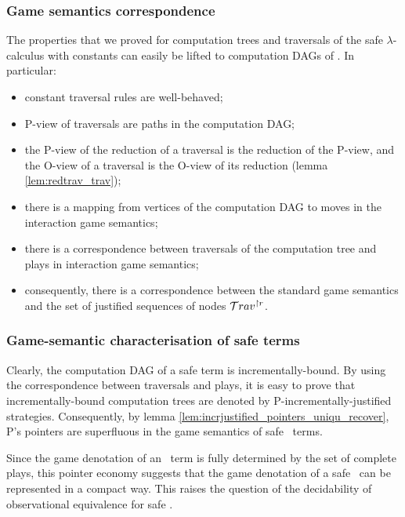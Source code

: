 \subsubsection{Game semantics correspondence}
The properties that we proved for computation trees and traversals
of the safe $\lambda$-calculus with constants can easily be lifted
to computation DAGs of \ialgol. In particular:
\begin{itemize}
\item constant traversal rules are well-behaved;
\item P-view of traversals are paths in the computation DAG;
\item the P-view of the reduction of a traversal is the reduction of the P-view,
and the O-view of a traversal is the O-view of its reduction (lemma
\ref{lem:redtrav_trav});
\item there is a mapping from vertices of the computation DAG to moves in the interaction game semantics;
\item there is a correspondence between traversals of the computation tree and plays in interaction game semantics;
\item consequently, there is a correspondence between the standard game semantics and
the set of justified sequences of nodes $\mathcal{T}rav^{\upharpoonright
r}$.
\end{itemize}

\subsubsection{Game-semantic characterisation of safe terms}
Clearly, the computation DAG of a safe term is incrementally-bound.
By using the correspondence between traversals and plays, it is easy
to prove that incrementally-bound computation trees are denoted by
P-incrementally-justified strategies. Consequently, by lemma
\ref{lem:incrjustified_pointers_uniqu_recover}, P's pointers are superfluous in the
game semantics of safe \ialgol\ terms.

Since the game denotation of an \ialgol\ term is fully determined by
the set of complete plays, this pointer economy suggests that the
game denotation of a safe \ialgol\ can be represented in a compact
way. This raises the question of the decidability of observational
equivalence for safe \ialgol.
